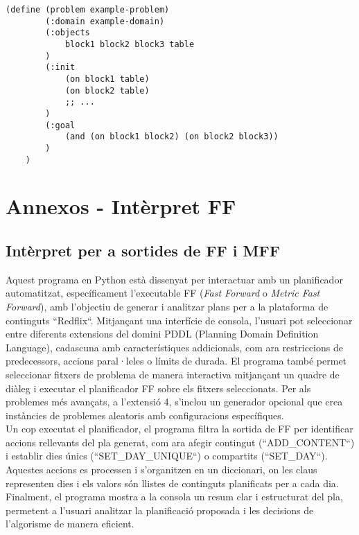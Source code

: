 \documentclass[a4paper]{article}
\begin{document}
	\begin{lstlisting}[language=PDDL, caption={Especificació del problema en PDDL}, label={lst:problemaPDDL}]
	(define (problem example-problem)
		(:domain example-domain)
		(:objects
			block1 block2 block3 table
		)
		(:init
			(on block1 table)
			(on block2 table)
			;; ...
		)
		(:goal
			(and (on block1 block2) (on block2 block3))
		)
	)
	\end{lstlisting}
	
	\newpage
	\section{Annexos - Intèrpret FF}
	
	\subsection{Intèrpret per a sortides de FF i MFF}
	\label{sec:FFInterpreter.py}
	
	Aquest programa en Python està dissenyat per interactuar amb un planificador automatitzat, específicament l'executable FF (\textit{Fast Forward} o \textit{Metric Fast Forward}), amb l'objectiu de generar i analitzar plans per a la plataforma de continguts ``Redflix``. Mitjançant una interfície de consola, l'usuari pot seleccionar entre diferents extensions del domini PDDL (Planning Domain Definition Language), cadascuna amb característiques addicionals, com ara restriccions de predecessors, accions paral·leles o límits de durada. El programa també permet seleccionar fitxers de problema de manera interactiva mitjançant un quadre de diàleg i executar el planificador FF sobre els fitxers seleccionats. Per als problemes més avançats, a l'extensió 4, s'inclou un generador opcional que crea instàncies de problemes aleatoris amb configuracions específiques. \\
	
	Un cop executat el planificador, el programa filtra la sortida de FF per identificar accions rellevants del pla generat, com ara afegir contingut (``ADD\_CONTENT``) i establir dies únics (``SET\_DAY\_UNIQUE``) o compartits (``SET\_DAY``). Aquestes accions es processen i s'organitzen en un diccionari, on les claus representen dies i els valors són llistes de continguts planificats per a cada dia. Finalment, el programa mostra a la consola un resum clar i estructurat del pla, permetent a l'usuari analitzar la planificació proposada i les decisions de l'algorisme de manera eficient.
	
\end{document}
